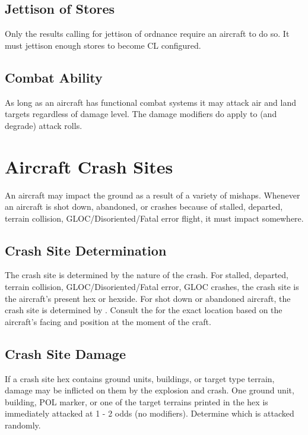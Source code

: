 \begin{advancedrules}
    \subsection{Jettison of Stores} Only the results calling for jettison of ordnance require an aircraft to do so. It must jettison enough stores to become CL configured.

    \subsection{Combat Ability} As long as an aircraft has functional combat systems it may attack air and land targets regardless of damage level. The damage modifiers do apply to (and degrade) attack rolls.

    \section{Aircraft Crash Sites}


    An aircraft may impact the ground as a result of a variety of mishaps. Whenever an aircraft is shot down, abandoned, or crashes because of stalled, departed, terrain collision, GLOC/Disoriented/Fatal error flight, it must impact somewhere.

    \subsection{Crash Site Determination} The crash site is determined by the nature of the crash. For stalled, departed, terrain collision, GLOC/Disoriented/Fatal error, GLOC crashes, the crash site is the aircraft's present hex or hexside. For shot down or abandoned aircraft, the crash site is determined by . Consult the  for the exact location based on the aircraft's facing and position at the moment of the craft.

    \subsection{Crash Site Damage} If a crash site hex contains ground units, buildings, or target type terrain, damage may be inflicted on them by the explosion and crash. One ground unit, building, POL marker, or one of the target terrains printed in the hex is immediately attacked at 1 - 2 odds (no modifiers). Determine which is attacked randomly. 
\end{advancedrules}
